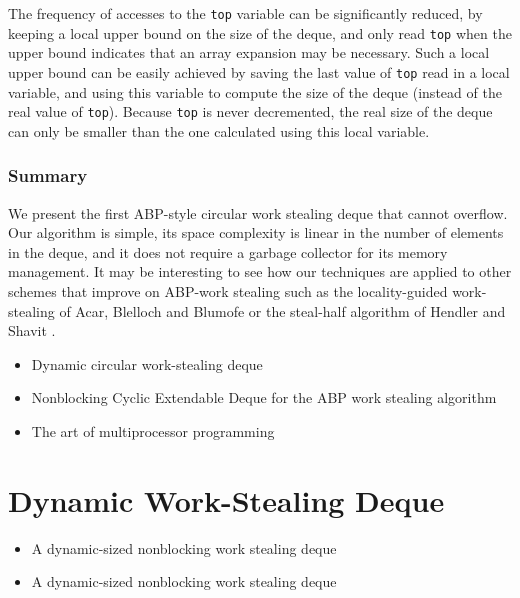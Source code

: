 The frequency of accesses to the \lstinline!top! variable can be
significantly reduced, by keeping a local upper bound on the size of
the deque, and only read \lstinline!top! when the upper bound
indicates that an array expansion may be necessary. Such a local upper
bound can be easily achieved by saving the last value of
\lstinline!top! read in a local variable, and using this variable to
compute the size of the deque (instead of the real value of
\lstinline!top!). Because \lstinline!top! is never decremented, the
real size of the deque can only be smaller than the one calculated
using this local variable.

\subsubsection{Summary}

We present the first ABP-style circular work stealing deque that
cannot overflow. Our algorithm is simple, its space complexity is
linear in the number of elements in the deque, and it does not require
a garbage collector for its memory management. It may be interesting
to see how our techniques are applied to other schemes that improve on
ABP-work stealing such as the locality-guided work-stealing of Acar,
Blelloch and Blumofe \cite{Acar2002} or the steal-half algorithm of
Hendler and Shavit \cite{Hendler2002}.


\begin{itemize}
\item Dynamic circular work-stealing deque \cite{Chase2005}
\item Nonblocking Cyclic Extendable Deque for the ABP work stealing
  algorithm \cite{Lev2005}
\item The art of multiprocessor programming \cite{Herlihy2008}
\end{itemize}


\section{Dynamic Work-Stealing Deque}
\label{sec:queues-implementation-dynamic-ws-deque}


\begin{itemize}
\item A dynamic-sized nonblocking work stealing deque
  \cite{Hendler2006}
\item A dynamic-sized nonblocking work stealing deque
  \cite{Hendler2006a}
\end{itemize}

